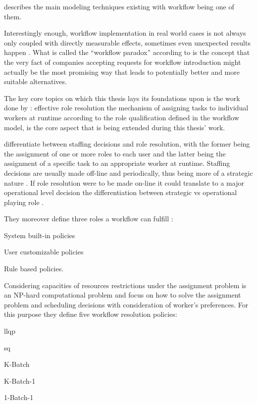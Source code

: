 \documentclass[draft=false]{seal_thesis}
\begin{document}
\citet{Aguilar-Saven2004} describes the main modeling techniques existing with workflow being one of them.

Interestingly enough, workflow implementation in real world cases is not always only coupled with directly measurable effects, sometimes even unexpected results happen \citep{Reijers2005}. What is called the ``workflow paradox'' according to \citet{Reijers2005} is the concept that the very fact of companies accepting requests for workflow introduction might actually be the most promising way that leads to potentially better and more suitable alternatives.

The key core topics on which this thesis lays its foundations upon is the work done by \citet{Zeng2005}: effective role resolution \ie the mechanism of assigning tasks to individual workers at runtime according to the role qualification defined in the workflow model, is the core aspect that is being extended during this thesis' work.

\citet{Zeng2005} differentiate between staffing decisions and role resolution, with the former being the assignment of one or more roles to each user and the latter being the assignment of a specific task to an appropriate worker at runtime. Staffing decisions are usually made off-line and periodically, thus being more of a strategic nature \citep{Zeng2005}. If role resolution were to be made on-line it could translate to a major operational level decision \ie the differentiation between strategic vs operational playing role \citep{Zeng2005}.

They moreover define three roles a workflow can fulfill \citep{Zeng2005}:
\begin{enumerate*}
	\item System built-in policies
	\item User customizable policies
	\item Rule based policies.
\end{enumerate*}

Considering capacities of resources restrictions under the assignment problem is an NP-hard computational problem and \citet{Zeng2005} focus on how to solve the assignment problem and scheduling decisions with consideration of worker's preferences. For this purpose they define five workflow resolution policies:
\begin{enumerate*}
	\item \gls{llqp}
	\item \gls{sq}
	\item K-Batch
	\item K-Batch-1
	\item 1-Batch-1
\end{enumerate*}
\end{document}

